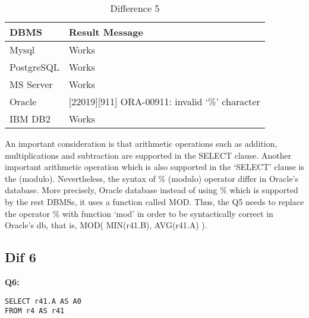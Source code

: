 \begin{table}[h]
\centering
\caption{Difference 5}
\label{my-label}
\begin{tabular}{|p{2cm}|p{11.5cm}| }
\hline
\textbf{DBMS} & \textbf{Result Message}                                \\ \hline
Mysql         & Works                                                  \\ \hline
PostgreSQL    & Works                                                  \\ \hline
MS Server     & Works                                                  \\ \hline
Oracle        & {[}22019{]}{[}911{]} ORA-00911: invalid ‘\%’ character \\ \hline
IBM DB2       & Works                                                  \\ \hline
\end{tabular}
\end{table}

An important consideration is that arithmetic operations such as addition, multiplications and  subtraction are supported in the SELECT clause. Another important arithmetic operation which is also supported in the ‘SELECT’ clause is the  (modulo). Nevertheless, the syntax of \% (modulo) operator differ in Oracle’s database. More precisely, Oracle database instead of using \% which is supported by the rest DBMSs, it uses a function called MOD. Thus, the Q5 needs to replace the operator \%  with function ‘mod’ in order to be syntactically correct in Oracle’s db, that is, MOD( MIN(r41.B), AVG(r41.A) ). 

\hfill\newpage
\subsection{Dif 6}
  
\textbf{Q6:}
\begin{mdframed}[backgroundcolor=lightgray!20]
\begin{lstlisting}[style=SQL]
SELECT r41.A AS A0
FROM r4 AS r41
\end{lstlisting}
\end{mdframed}

